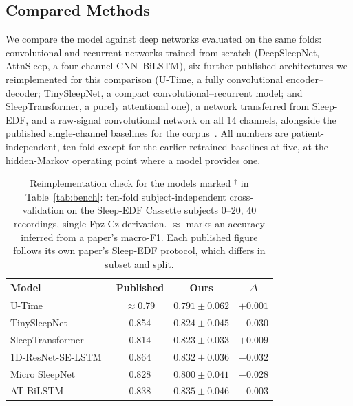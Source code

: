 \documentclass{ieeeaccess}
\begin{document}
\subsection{Compared Methods}
We compare the model against deep networks evaluated on the same folds: convolutional and
recurrent networks trained from scratch (DeepSleepNet, AttnSleep, a four-channel CNN--BiLSTM),
six further published architectures we reimplemented for this comparison (U-Time, a
fully convolutional encoder--decoder; TinySleepNet, a compact convolutional--recurrent model;
and SleepTransformer, a purely attentional one), a
network transferred from Sleep-EDF, and a raw-signal convolutional network on all $14$ channels,
alongside the published single-channel baselines for the corpus~\cite{maiti2026isleeps}. All numbers are
patient-independent, ten-fold except for the earlier retrained baselines at five, at the hidden-Markov operating point where a model provides one.

\begin{table}[t]
\caption{Reimplementation check for the models marked $^{\dagger}$ in
Table~\ref{tab:bench}: ten-fold subject-independent cross-validation on the
Sleep-EDF Cassette subjects $0$--$20$, $40$ recordings, single Fpz-Cz derivation.
$\approx$ marks an accuracy inferred from a paper's macro-F1. Each published figure
follows its own paper's Sleep-EDF protocol, which differs in subset and split.}
\label{tab:reimpl}
\centering
\begin{tabular}{@{}l c c c@{}}
\toprule
Model & Published & Ours & $\Delta$ \\
\midrule
U-Time~\cite{perslev2019utime} & $\approx$0.79 & $0.791 \pm 0.062$ & $+0.001$ \\
TinySleepNet~\cite{supratak2020tinysleepnet} & 0.854 & $0.824 \pm 0.045$ & $-0.030$ \\
SleepTransformer~\cite{sleeptransformer2022} & 0.814 & $0.823 \pm 0.033$ & $+0.009$ \\
1D-ResNet-SE-LSTM~\cite{li2023resnetselstm} & 0.864 & $0.832 \pm 0.036$ & $-0.032$ \\
Micro SleepNet~\cite{liu2023microsleepnet} & 0.828 & $0.800 \pm 0.041$ & $-0.028$ \\
AT-BiLSTM~\cite{fu2021atbilstm} & 0.838 & $0.835 \pm 0.046$ & $-0.003$ \\
\bottomrule
\end{tabular}
\end{table}
\end{document}

